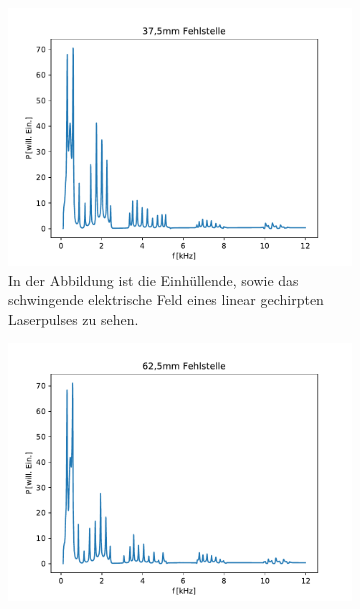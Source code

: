             \begin{figure}[ht]
                \centering
                \begin{subfigure}[b]{0.45\textwidth}
                    \centering
                    \includegraphics[scale=0.45]{./pictures/1dim_10_Zylinder_375_Fehlstelle.pdf}
                    \caption{In der Abbildung ist die Einhüllende, sowie das schwingende elektrische Feld eines linear gechirpten Laserpulses zu sehen.}
                    \label{fig:1dim_10_Zylinder_375_Fehlstelle}
                \end{subfigure}
                \hfill
                \centering
                \begin{subfigure}[b]{0.45\textwidth}
                    \centering
                    \includegraphics[scale=0.45]{./pictures/1dim_4_Zylinder_625_Fehlstelle.pdf}

\end{subfigure}
\end{figure}
